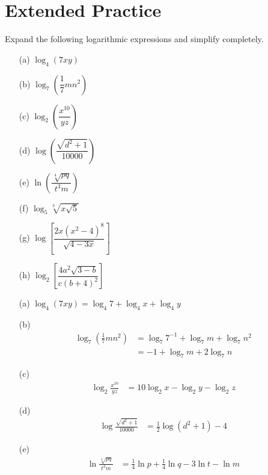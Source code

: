 \documentclass{ximera}
\begin{document}
\bigskip
\section*{Extended Practice}

\begin{problem}
Expand the following logarithmic expressions and simplify completely.
\begin{enumerate}
  \item[(a)] $\log_4 (7xy)$
  \medskip
  \item[(b)] $\log_7 \!\left(\dfrac{1}{7}mn^2\right)$
  \medskip
  \item[(c)] $\log_2\!\left(\dfrac{x^{10}}{yz}\right)$
  \medskip
  \item[(d)] $\log\!\left(\dfrac{\sqrt{d^2+1}}{10000}\right)$
  \medskip
  \item[(e)] $\ln\!\left(\dfrac{\sqrt[4]{pq}}{t^3m}\right)$
  \medskip
  \item[(f)] $\log_5\sqrt[3]{x\sqrt{5}}$
  \medskip
  \item[(g)] $\log\!\left[\dfrac{2x(x^2-4)^8}{\sqrt{4-3x}}\right]$
  \medskip
  \item[(h)] $\log_2\!\left[\dfrac{4a^2\sqrt{3-b}}{c(b+4)^2}\right]$
\end{enumerate}

\begin{solution}
\begin{enumerate}
  \item[(a)] $\log_4(7xy) = \log_4 7 + \log_4 x + \log_4 y$

  \item[(b)]
  \begin{align*}
    \log_7\!\left(\tfrac{1}{7}mn^2\right) &= \log_7 7^{-1} + \log_7 m + \log_7 n^2\\
                                           &= -1 + \log_7 m + 2\log_7 n
  \end{align*}

  \item[(c)]
  \begin{align*}
    \log_2\frac{x^{10}}{yz} &= 10\log_2 x - \log_2 y - \log_2 z
  \end{align*}

  \item[(d)]
  \begin{align*}
    \log\frac{\sqrt{d^2+1}}{10000} &= \tfrac{1}{2}\log(d^2+1) - 4
  \end{align*}

  \item[(e)]
  \begin{align*}
    \ln\frac{\sqrt[4]{pq}}{t^3m} &= \tfrac{1}{4}\ln p + \tfrac{1}{4}\ln q - 3\ln t - \ln m
  \end{align*}


\end{enumerate}
\end{solution}
\end{problem}
\end{document}
